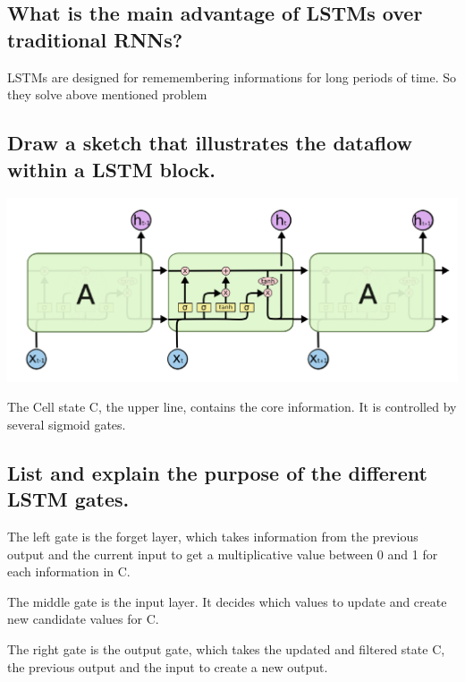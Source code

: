 \subsection{What is the main advantage of LSTMs over traditional RNNs?}
LSTMs are designed for rememembering informations for long periods of time. So they solve above mentioned problem
\subsection{Draw a sketch that illustrates the dataflow within a LSTM block.}
\begin{minipage}{\textwidth}
\includegraphics[width=\textwidth]{./img/lstm.png}
\end{minipage}
The Cell state C, the upper line, contains the core information. It is controlled by several
sigmoid gates. 
\subsection{List and explain the purpose of the different LSTM gates.}
The left gate is the forget layer, which takes information from the previous output and the current input to get a multiplicative value between 0 and 1 for each information in C.

The middle gate is the input layer. It decides which values to update and create new candidate values for C.

The right gate is the output gate, which takes the updated and filtered state C, the previous output and the input to create a new output.
